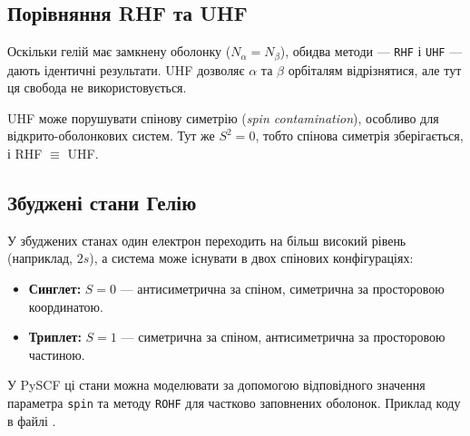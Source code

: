 \subsection{Порівняння RHF та UHF}

Оскільки гелій має замкнену оболонку ($N_\alpha = N_\beta$), обидва методи --- \texttt{RHF}
і \texttt{UHF}  --- дають ідентичні результати.
UHF дозволяє $\alpha$ та $\beta$ орбіталям відрізнятися, але тут ця свобода не використовується.


\begin{commentbox}
    UHF може порушувати спінову симетрію (\textit{spin conta\-mination}), особливо для відкрито-оболонкових систем.
    Тут же $S^2 = 0$, тобто спінова симетрія зберігається, і RHF $\equiv$ UHF.
\end{commentbox}


\subsection{Збуджені стани Гелію}

У збуджених станах один електрон переходить на більш високий рівень (наприклад, $2s$),
а система може існувати в двох спінових конфігураціях:

\begin{itemize}
    \item \textbf{Синглет:} $S=0$ --- антисиметрична за спіном, симетрична за просторовою координатою.
    \item \textbf{Триплет:} $S=1$ --- симетрична за спіном, антисиметрична за просторовою частиною.
\end{itemize}

У PySCF ці стани можна моделювати за допомогою відповідного значення параметра \texttt{spin}
та методу \texttt{ROHF} для частково заповнених оболонок. Приклад коду в файлі .

